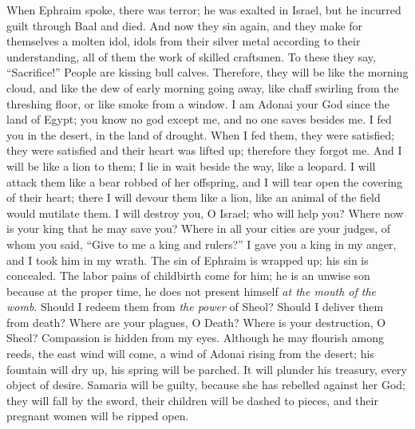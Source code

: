 \begin{biblechapter} %
 When Ephraim spoke, there was terror; 
he was exalted in Israel, 
but he incurred guilt through Baal and died.
\verse And now they sin again, 
and they make for themselves a molten idol, 
idols from their silver metal according to their understanding, 
all of them the work of skilled craftsmen. 
To these they say, “Sacrifice!” 
People are kissing bull calves.
\verse Therefore, they will be like the morning cloud, 
and like the dew of early morning going away, 
like chaff swirling from the threshing floor, 
or like smoke from a window.
\verse I am Adonai your God 
since the land of Egypt; 
you know no god except me, 
and no one saves besides me.
\verse I fed you in the desert, 
in the land of drought.
\verse When I fed them, they were satisfied; 
they were satisfied and their heart was lifted up; 
therefore they forgot me.
\verse And I will be like a lion to them; 
I lie in wait beside the way, like a leopard.
\verse I will attack them like a bear robbed of her offspring, 
and I will tear open the covering of their heart; 
there I will devour them like a lion, 
like an animal of the field would mutilate them.
\verse I will destroy you, O Israel; 
who will help you?
\verse Where now is your king that he may save you? 
Where in all your cities are your judges, 
of whom you said, “Give to 
me a king and rulers?”
\verse I gave you a king in my anger, 
and I took him in my wrath.
\verse The sin of Ephraim is wrapped up; 
his sin is concealed.
\verse The labor pains of childbirth come for him; 
he is an unwise son 
because at the proper time, he does not present himself 
\textit{at the mouth of the womb}.
\verse Should I redeem them from \textit{the power} of Sheol?  
Should I deliver them from death? 
Where are your plagues, O Death? 
Where is your destruction, O Sheol? 
Compassion is hidden from my eyes.
\verse Although he may flourish among reeds, 
the east wind will come, a wind of Adonai 
rising from the desert; 
his fountain will dry up, 
his spring will be parched. 
It will plunder his treasury, 
every object of desire.
\verse {} Samaria will be guilty, 
because she has rebelled against her God; 
they will fall by the sword, 
their children will be dashed to pieces, 
and their pregnant women will be ripped open.
\end{biblechapter}

